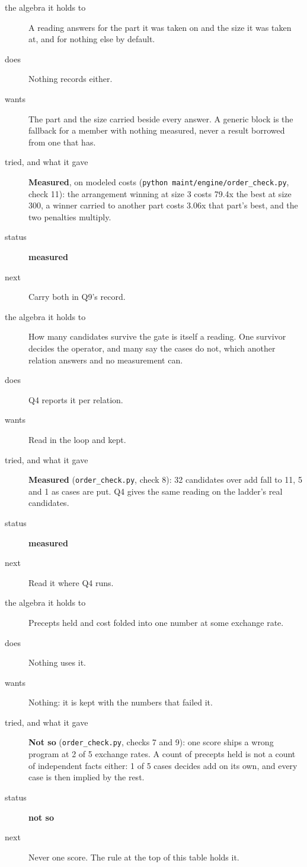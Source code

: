 \begin{description}
\item[{the algebra it holds to}] A reading answers for the part it was taken on and the size it was taken at, and for nothing else by default.
\item[{does}] Nothing records either.
\item[{wants}] The part and the size carried beside every answer. A generic block is the fallback for a member with nothing measured, never a result borrowed from one that has.
\item[{tried, and what it gave}] \textbf{Measured}, on modeled costs (\texttt{python maint/\allowbreak{}engine/\allowbreak{}order\_\allowbreak{}check.\allowbreak{}py}, check 11): the arrangement winning at size 3 costs 79.4x the best at size 300, a winner carried to another part costs 3.06x that part's best, and the two penalties multiply.
\item[{status}] \textbf{measured}
\item[{next}] Carry both in Q9's record.
\end{description}

\begin{description}
\item[{the algebra it holds to}] How many candidates survive the gate is itself a reading. One survivor decides the operator, and many say the cases do not, which another relation answers and no measurement can.
\item[{does}] Q4 reports it per relation.
\item[{wants}] Read in the loop and kept.
\item[{tried, and what it gave}] \textbf{Measured} (\texttt{order\_\allowbreak{}check.\allowbreak{}py}, check 8): 32 candidates over add fall to 11, 5 and 1 as cases are put. Q4 gives the same reading on the ladder's real candidates.
\item[{status}] \textbf{measured}
\item[{next}] Read it where Q4 runs.
\end{description}

\begin{description}
\item[{the algebra it holds to}] Precepts held and cost folded into one number at some exchange rate.
\item[{does}] Nothing uses it.
\item[{wants}] Nothing: it is kept with the numbers that failed it.
\item[{tried, and what it gave}] \textbf{Not so} (\texttt{order\_\allowbreak{}check.\allowbreak{}py}, checks 7 and 9): one score ships a wrong program at 2 of 5 exchange rates. A count of precepts held is not a count of independent facts either: 1 of 5 cases decides add on its own, and every case is then implied by the rest.
\item[{status}] \textbf{not so}
\item[{next}] Never one score. The rule at the top of this table holds it.
\end{description}

